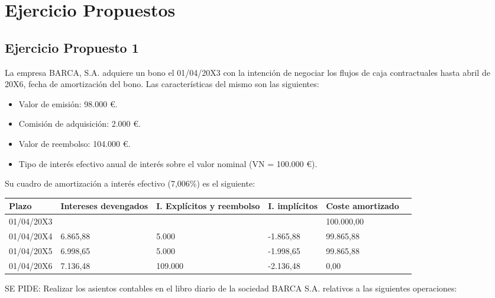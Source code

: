 \section{Ejercicio Propuestos}
\subsection{Ejercicio Propuesto 1}


La empresa BARCA, S.A. adquiere un bono el 01/04/20X3 con la intención de negociar los flujos de caja contractuales hasta abril de 20X6, fecha de amortización del bono. Las características del mismo son las siguientes:
\begin{itemize}
    \item Valor de emisión: 98.000 €.
    \item Comisión de adquisición: 2.000 €.
    \item Valor de reembolso: 104.000 €.
    \item Tipo de interés efectivo anual de interés sobre el valor nominal (VN = 100.000 €).
\end{itemize}

Su cuadro de amortización a interés efectivo (7,006\%) es el siguiente:
\begin{table}
\centering
\begin{tabular}{|p{2cm}|p{2cm}|p{2cm}|p{2cm}|p{2cm}|p{2cm}}
    \hline
    Plazo & Intereses devengados & I. Explícitos y reembolso & I. implícitos & Coste amortizado \\
    \hline
    01/04/20X3 & & & & 100.000,00 \\
    \hline
    01/04/20X4 & 6.865,88 & 5.000 & -1.865,88 & 99.865,88 \\
    \hline
    01/04/20X5 & 6.998,65 & 5.000 & -1.998,65 & 99.865,88 \\
    \hline
    01/04/20X6 & 7.136,48 & 109.000 & -2.136,48 & 0,00 \\
    \hline
    \end{tabular}
\end{table}


SE PIDE: Realizar los asientos contables en el libro diario de la sociedad BARCA S.A. relativos a las siguientes operaciones:

